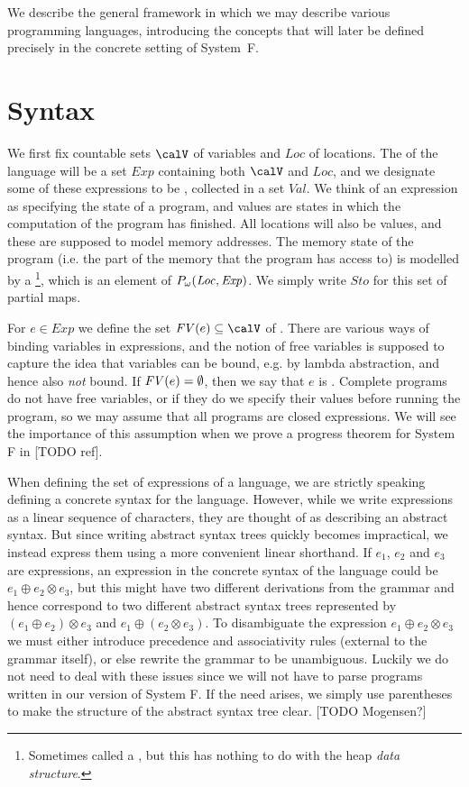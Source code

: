 \documentclass[a4paper, 11pt, article, danish, oneside]{memoir}
\DeclarePairedDelimiter{\auxdelimparen}{(}{)}
\newcommand{\setVar}{\calV}
\newcommand{\setLoc}{\mathit{Loc}}
\newcommand{\setSto}{\mathit{Sto}}
\newcommand{\setExp}{\mathit{Exp}}
\newcommand{\setVal}{\mathit{Val}}
\newcommand{\freevar}[2][]{\mathit{FV}\auxdelimparen[#1]{#2}}
\newcommand{\pmaps}[3][]{%
    \ifstrempty{#1}%
        {%
            P(#2,#3)
        }{%
            P_{#1}(#2,#3)
        }%
}
\begin{document}
We describe the general framework in which we may describe various programming languages, introducing the concepts that will later be defined precisely in the concrete setting of System~F.

\section{Syntax}

We first fix countable sets $\setVar$ of variables and $\setLoc$ of locations. The  of the language will be a set $\setExp$ containing both $\setVar$ and $\setLoc$, and we designate some of these expressions to be , collected in a set $\setVal$. We think of an expression as specifying the state of a program, and values are states in which the computation of the program has finished. All locations will also be values, and these are supposed to model memory addresses. The memory state of the program (i.e. the part of the memory that the program has access to) is modelled by a \footnote{Sometimes called a , but this has nothing to do with the heap \emph{data structure}.}, which is an element of $\pmaps[\omega]{\setLoc}{\setExp}$. We simply write $\setSto$ for this set of partial maps.

For $e \in \setExp$ we define the set $\freevar{e} \subseteq \setVar$ of . There are various ways of binding variables in expressions, and the notion of free variables is supposed to capture the idea that variables can be bound, e.g. by lambda abstraction, and hence also \emph{not} bound. If $\freevar{e} = \emptyset$, then we say that $e$ is . Complete programs do not have free variables, or if they do we specify their values before running the program, so we may assume that all programs are closed expressions. We will see the importance of this assumption when we prove a progress theorem for System F in [TODO ref].

When defining the set of expressions of a language, we are strictly speaking defining a concrete syntax for the language. However, while we write expressions as a linear sequence of characters, they are thought of as describing an abstract syntax. But since writing abstract syntax trees quickly becomes impractical, we instead express them using a more convenient linear shorthand. If $e_1$, $e_2$ and $e_3$ are expressions, an expression in the concrete syntax of the language could be $e_1 \oplus e_2 \otimes e_3$, but this might have two different derivations from the grammar and hence correspond to two different abstract syntax trees represented by $(e_1 \oplus e_2) \otimes e_3$ and $e_1 \oplus (e_2 \otimes e_3)$. To disambiguate the expression $e_1 \oplus e_2 \otimes e_3$ we must either introduce precedence and associativity rules (external to the grammar itself), or else rewrite the grammar to be unambiguous. Luckily we do not need to deal with these issues since we will not have to parse programs written in our version of System F. If the need arises, we simply use parentheses to make the structure of the abstract syntax tree clear. [TODO Mogensen?]
\end{document}
